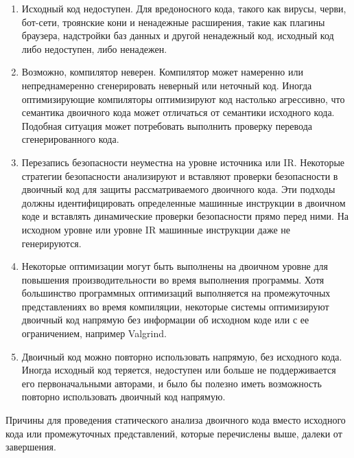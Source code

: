 \begin{enumerate}
        \item Исходный код недоступен. Для вредоносного кода, такого как вирусы, черви, бот-сети, троянские кони и 
            ненадежные расширения, такие как плагины браузера, надстройки баз данных и другой ненадежный код, исходный код 
            либо недоступен, либо ненадежен. 
        \item Возможно, компилятор неверен. Компилятор может намеренно или непреднамеренно сгенерировать неверный или 
            неточный код. Иногда оптимизирующие компиляторы оптимизируют код настолько агрессивно, что семантика двоичного 
            кода может отличаться от семантики исходного кода. Подобная ситуация может потребовать выполнить проверку 
            перевода сгенерированного кода.
        \item Перезапись безопасности неуместна на уровне источника или IR. Некоторые стратегии безопасности анализируют и 
            вставляют проверки безопасности в двоичный код для защиты рассматриваемого двоичного кода. Эти подходы должны 
            идентифицировать определенные машинные инструкции в двоичном коде и вставлять динамические проверки 
            безопасности прямо перед ними. На исходном уровне или уровне IR машинные инструкции даже не генерируются.
        \item Некоторые оптимизации могут быть выполнены на двоичном уровне для повышения производительности во время  
            выполнения программы. Хотя большинство программных оптимизаций выполняется на промежуточных представлениях во 
            время компиляции, некоторые системы оптимизируют двоичный код напрямую без информации об исходном коде или с  
            ее ограничением, например Valgrind\cite{Valgrind2008}.
        \item Двоичный код можно повторно использовать напрямую, без исходного кода. Иногда исходный код теряется, 
            недоступен или больше не поддерживается его первоначальными авторами, и было бы полезно иметь возможность 
            повторно использовать двоичный код напрямую.
\end{enumerate}

Причины для проведения статического анализа двоичного кода вместо исходного кода или промежуточных представлений, которые 
перечислены выше, далеки от завершения.

